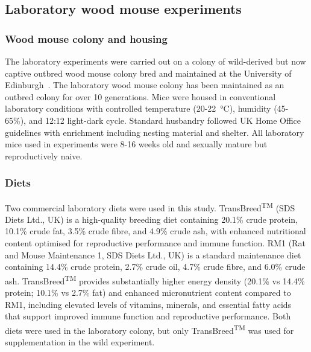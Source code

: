 \documentclass[a4paper, hidelinks, 11pt]{article}
\begin{document}
\subsection{Laboratory wood mouse experiments}

\subsubsection{Wood mouse colony and housing}
The laboratory experiments were carried out on a colony of wild-derived but now captive outbred wood mouse colony bred and maintained at the University of Edinburgh~\cite{Sweeny2021}. The laboratory wood mouse colony has been maintained as an outbred colony for over 10 generations. Mice were housed in conventional laboratory conditions with controlled temperature (20-22 °C), humidity (45-65\%), and 12:12 light-dark cycle. Standard husbandry followed UK Home Office guidelines with enrichment including nesting material and shelter. All laboratory mice used in experiments were 8-16 weeks old and sexually mature but reproductively naive.

\subsubsection{Diets}
Two commercial laboratory diets were used in this study. TransBreed\textsuperscript{TM} (SDS Diets Ltd., UK) is a high-quality breeding diet containing 20.1\% crude protein, 10.1\% crude fat, 3.5\% crude fibre, and 4.9\% crude ash, with enhanced nutritional content optimised for reproductive performance and immune function. RM1 (Rat and Mouse Maintenance 1, SDS Diets Ltd., UK) is a standard maintenance diet containing 14.4\% crude protein, 2.7\% crude oil, 4.7\% crude fibre, and 6.0\% crude ash. TransBreed\textsuperscript{TM} provides substantially higher energy density (20.1\% vs 14.4\% protein; 10.1\% vs 2.7\% fat) and enhanced micronutrient content compared to RM1, including elevated levels of vitamins, minerals, and essential fatty acids that support improved immune function and reproductive performance. Both diets were used in the laboratory colony, but only TransBreed\textsuperscript{TM} was used for supplementation in the wild experiment.
\end{document}
